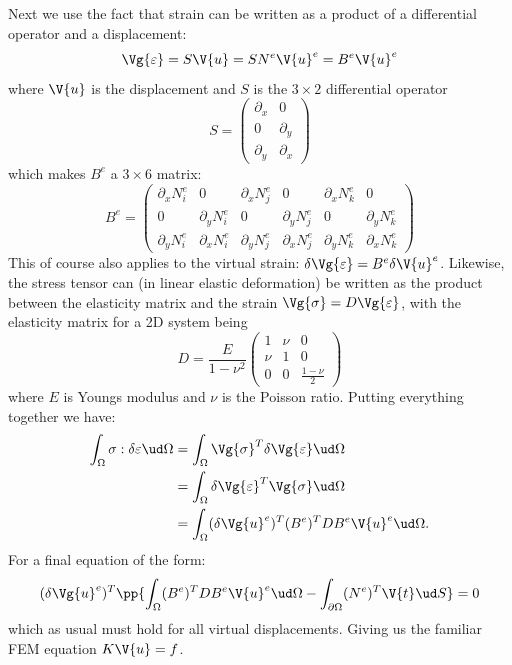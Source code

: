 \documentclass[sigconf]{acmart}
\begin{document}
Next we use the fact that strain can be written as a product of a differential operator and a displacement:
\begin{equation*}
	\Vg{\varepsilon} = S \V{u} = S N^e \V{u}^e = B^e \V{u}^e
\end{equation*}
where $ \V{u} $ is the displacement and $ S $ is the $ 3\times 2 $ differential operator
\begin{equation*}
	S = \begin{pmatrix}
	\partial_x & 0 \\ 0 & \partial_y \\ \partial_y & \partial_x
	\end{pmatrix}
\end{equation*}
which makes $ B^e $ a $ 3 \times 6 $ matrix:
\begin{equation*}
	B^e = \begin{pmatrix}
	\partial_x N^e_i & 0 & \partial_x N^e_j &0 & \partial_x N^e_k & 0 \\
	0 & \partial_y N^e_i & 0 & \partial_y N^e_j &0 & \partial_y N^e_k \\
	\partial_y N^e_i & \partial_x N^e_i & \partial_y N^e_j & \partial_x N^e_j & \partial_y N^e_k & \partial_x N^e_k
	\end{pmatrix}
\end{equation*}
This of course also applies to the virtual strain: $ \delta \Vg{\varepsilon} = B^e \delta \V{u}^e $. Likewise, the stress tensor can (in linear elastic deformation) be written as the product between the elasticity matrix and the strain $ \Vg{\sigma} = D \Vg{\varepsilon} $, with the elasticity matrix for a 2D system being
\begin{equation*}
	D = \frac{E}{1- \nu^2} \begin{pmatrix}
	1 & \nu & 0 \\ \nu & 1 & 0 \\ 0 & 0 & \frac{1-\nu}{2}
	\end{pmatrix}
\end{equation*}
where $ E $ is Youngs modulus and $ \nu $ is the Poisson ratio. Putting everything together we have:
\begin{align*}
	\int_{\Omega} \sigma : \delta \varepsilon \ud \Omega &= \int_{\Omega} \Vg{\sigma}^T\delta \Vg{\varepsilon} \ud \Omega \\
	&= \int_{\Omega} \delta \Vg{\varepsilon}^T \Vg{\sigma}  \ud \Omega \\
	&=  \int_{\Omega}(\delta \Vg{u}^e)^T  (B^e)^T D B^e \V{u}^e \ud \Omega.
\end{align*}
For a final equation of the form:
\begin{equation}
	(\delta \Vg{u}^e)^T \pp{\int_{\Omega} (B^e)^T D B^e \V{u}^e \ud \Omega - \int_{\partial \Omega} (N^e)^T \V{t}\ud S} = 0
\end{equation}
which as usual must hold for all virtual displacements. Giving us the familiar FEM equation $ K \V{u} = f $.
 
\end{document}
